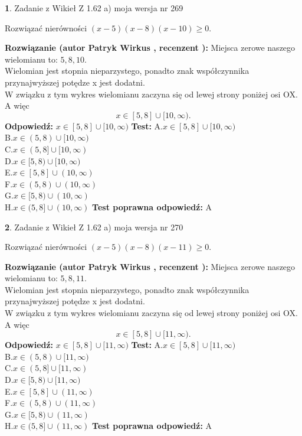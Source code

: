 \documentclass[12pt, a4paper]{article}
\theoremstyle{definition} %
\newtheorem{zad}{}
\newcommand{\zadStart}[1]{\begin{zad}#1\newline}
\newcommand{\zadStop}{\end{zad}}
\newcommand{\rozwStart}[2]{\noindent \textbf{Rozwiązanie (autor #1 , recenzent #2): }\newline}
\newcommand{\rozwStop}{\newline}
\newcommand{\odpStart}{\noindent \textbf{Odpowiedź:}\newline}
\newcommand{\odpStop}{\newline}
\newcommand{\testStart}{\noindent \textbf{Test:}\newline}
\newcommand{\testStop}{\newline}
\newcommand{\kluczStart}{\noindent \textbf{Test poprawna odpowiedź:}\newline}
\newcommand{\kluczStop}{\newline}
\begin{document}
\zadStart{Zadanie z Wikieł Z 1.62 a) moja wersja nr 269}

Rozwiązać nierówności $(x-5)(x-8)(x-10)\ge0$.
\zadStop
\rozwStart{Patryk Wirkus}{}
Miejsca zerowe naszego wielomianu to: $5, 8, 10$.\\
Wielomian jest stopnia nieparzystego, ponadto znak współczynnika przy\linebreak najwyższej potędze x jest dodatni.\\ W związku z tym wykres wielomianu zaczyna się od lewej strony poniżej osi OX. A więc $$x \in [5,8] \cup [10,\infty).$$
\rozwStop
\odpStart
$x \in [5,8] \cup [10,\infty)$
\odpStop
\testStart
A.$x \in [5,8] \cup [10,\infty)$\\
B.$x \in (5,8) \cup [10,\infty)$\\
C.$x \in (5,8] \cup [10,\infty)$\\
D.$x \in [5,8) \cup [10,\infty)$\\
E.$x \in [5,8] \cup (10,\infty)$\\
F.$x \in (5,8) \cup (10,\infty)$\\
G.$x \in [5,8) \cup (10,\infty)$\\
H.$x \in (5,8] \cup (10,\infty)$
\testStop
\kluczStart
A
\kluczStop



\zadStart{Zadanie z Wikieł Z 1.62 a) moja wersja nr 270}

Rozwiązać nierówności $(x-5)(x-8)(x-11)\ge0$.
\zadStop
\rozwStart{Patryk Wirkus}{}
Miejsca zerowe naszego wielomianu to: $5, 8, 11$.\\
Wielomian jest stopnia nieparzystego, ponadto znak współczynnika przy\linebreak najwyższej potędze x jest dodatni.\\ W związku z tym wykres wielomianu zaczyna się od lewej strony poniżej osi OX. A więc $$x \in [5,8] \cup [11,\infty).$$
\rozwStop
\odpStart
$x \in [5,8] \cup [11,\infty)$
\odpStop
\testStart
A.$x \in [5,8] \cup [11,\infty)$\\
B.$x \in (5,8) \cup [11,\infty)$\\
C.$x \in (5,8] \cup [11,\infty)$\\
D.$x \in [5,8) \cup [11,\infty)$\\
E.$x \in [5,8] \cup (11,\infty)$\\
F.$x \in (5,8) \cup (11,\infty)$\\
G.$x \in [5,8) \cup (11,\infty)$\\
H.$x \in (5,8] \cup (11,\infty)$
\testStop
\kluczStart
A
\kluczStop
\end{document}
